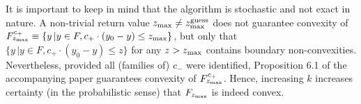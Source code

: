 \documentclass[a4paper]{article}
\theoremstyle{definition}
\begin{document}
\begin{enumerate}
It is important to keep in mind that the algorithm is stochastic and not exact in nature.
A non-trivial return value $z_{\max}\neq z^{\rm guess}_{\rm max}$ does not guarantee convexity of  $F^{c_+}_{z_{\rm max}}\equiv \{y\, | y\in F, c_+ \cdot (y_0-y)\leq z_{\rm max}\}$, but only that $\{y\, | y\in F,c_+ \cdot (y_0-y)\leq z\}$ for any $z>z_{\rm max}$ contains boundary non-convexities.
Nevertheless, provided all (families of) $c_-$ were identified, Proposition 6.1 of the accompanying paper guarantees convexity of $F^{c_+}_{z_{\rm max}}$. Hence, increasing $k$ increases certainty (in the probabilistic sense) that $F_{z_{\rm max}}$ is indeed convex.

\end{enumerate}
\end{document}
